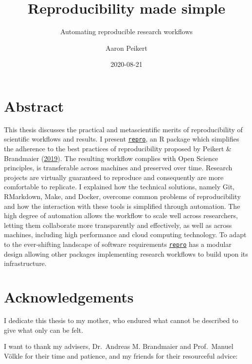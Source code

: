 \documentclass[12pt,a4paper,twoside]{article}
\title{Reproducibility made simple}
\subtitle{Automating reproducible research workflows}
\author{Aaron Peikert}
\date{2020-08-21}
\begin{document}
\maketitle

{
\setcounter{tocdepth}{2}
\tableofcontents
}
\newpage\null\thispagestyle{empty}\newpage

\hypertarget{abstract}{%
\section*{Abstract}\label{abstract}}

This thesis discusses the practical and metascientific merits of reproducibility of scientific workflows and results. I present \href{https://github.com/aaronpeikert/repro}{\texttt{repro}}, an R package which simplifies the adherence to the best practices of reproducibility proposed by Peikert \& Brandmaier (\protect\hyperlink{ref-peikertReproducibleDataAnalysis2019}{2019}).
The resulting workflow complies with Open Science principles, is transferable across machines and preserved over time.
Research projects are virtually guaranteed to reproduce and consequently are more comfortable to replicate.
I explained how the technical solutions, namely Git, RMarkdown, Make, and Docker, overcome common problems of reproducibility and how the interaction with these tools is simplified through automation.
The high degree of automation allows the workflow to scale well across researchers, letting them collaborate more transparently and effectively, as well as across machines, including high performance and cloud computing technology.
To adapt to the ever-shifting landscape of software requirements \href{https://github.com/aaronpeikert/repro}{\texttt{repro}} has a modular design allowing other packages implementing research workflows to build upon its infrastructure.

\hypertarget{acknowledgements}{%
\section*{Acknowledgements}\label{acknowledgements}}

I dedicate this thesis to my mother, who endured what cannot be described to give what only can be felt.

I want to thank my advisers, Dr.~Andreas M. Brandmaier and Prof.~Manuel Völkle for their time and patience, and my friends for their resourceful advice:
\end{document}
